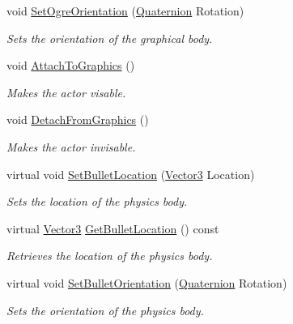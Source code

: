 \begin{DoxyCompactItemize}
void \hyperlink{classphys_1_1ActorBase_a7b2d13cb1e8bba60eeae782a53fd5e49}{SetOgreOrientation} (\hyperlink{classphys_1_1Quaternion}{Quaternion} Rotation)
\begin{DoxyCompactList}\small\item\em Sets the orientation of the graphical body. \item\end{DoxyCompactList}\item 
void \hyperlink{classphys_1_1ActorBase_a45f190cb9b647bb3385d1298f9dab589}{AttachToGraphics} ()
\begin{DoxyCompactList}\small\item\em Makes the actor visable. \item\end{DoxyCompactList}\item 
void \hyperlink{classphys_1_1ActorBase_acc352d14b6d7f15694ea108ec1c281ec}{DetachFromGraphics} ()
\begin{DoxyCompactList}\small\item\em Makes the actor invisable. \item\end{DoxyCompactList}\item 
virtual void \hyperlink{classphys_1_1ActorBase_aa7ab524d2905e640cea6324cce9ccfdb}{SetBulletLocation} (\hyperlink{classphys_1_1Vector3}{Vector3} Location)
\begin{DoxyCompactList}\small\item\em Sets the location of the physics body. \item\end{DoxyCompactList}\item 
virtual \hyperlink{classphys_1_1Vector3}{Vector3} \hyperlink{classphys_1_1ActorBase_a9b32df1efdc346f5d6c0920b959c09a3}{GetBulletLocation} () const 
\begin{DoxyCompactList}\small\item\em Retrieves the location of the physics body. \item\end{DoxyCompactList}\item 
virtual void \hyperlink{classphys_1_1ActorBase_a492244ac46ced53b809f436da992bc84}{SetBulletOrientation} (\hyperlink{classphys_1_1Quaternion}{Quaternion} Rotation)
\begin{DoxyCompactList}\small\item\em Sets the orientation of the physics body. \item\end{DoxyCompactList}\end{DoxyCompactItemize}
